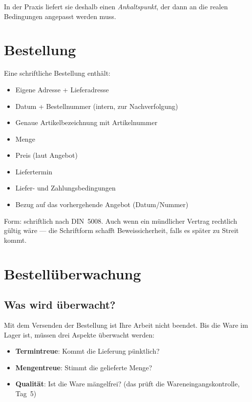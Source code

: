 \documentclass[11pt, a4paper]{article}
\begin{document}
In der Praxis liefert sie deshalb einen \emph{Anhaltspunkt}, der dann an die realen
Bedingungen angepasst werden muss.

\section{Bestellung}

Eine schriftliche Bestellung enthält:

\begin{itemize}[itemsep=0pt]
  \item Eigene Adresse + Lieferadresse
  \item Datum + Bestellnummer (intern, zur Nachverfolgung)
  \item Genaue Artikelbezeichnung mit Artikelnummer
  \item Menge
  \item Preis (laut Angebot)
  \item Liefertermin
  \item Liefer- und Zahlungsbedingungen
  \item Bezug auf das vorhergehende Angebot (Datum/Nummer)
\end{itemize}

Form: schriftlich nach DIN~5008. Auch wenn ein mündlicher Vertrag rechtlich gültig
wäre --- die Schriftform schafft Beweissicherheit, falls es später zu Streit kommt.

\section{Bestellüberwachung}

\subsection{Was wird überwacht?}

Mit dem Versenden der Bestellung ist Ihre Arbeit nicht beendet. Bis die Ware im Lager
ist, müssen drei Aspekte überwacht werden:

\begin{itemize}[itemsep=0pt]
  \item \textbf{Termintreue}: Kommt die Lieferung pünktlich?
  \item \textbf{Mengentreue}: Stimmt die gelieferte Menge?
  \item \textbf{Qualität}: Ist die Ware mängelfrei? (das prüft die Wareneingangs­kontrolle, Tag~5)
\end{itemize}
\end{document}
